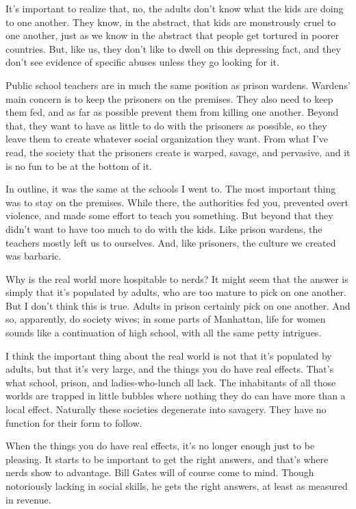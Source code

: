 \documentclass[12pt]{book}
\begin{document}
It's important to realize that, no, the adults don't know what the kids
are doing to one another. They know, in the abstract, that kids are
monstrously cruel to one another, just as we know in the abstract that
people get tortured in poorer countries. But, like us, they don't like
to dwell on this depressing fact, and they don't see evidence of
specific abuses unless they go looking for it.

Public school teachers are in much the same position as prison wardens.
Wardens' main concern is to keep the prisoners on the premises. They
also need to keep them fed, and as far as possible prevent them from
killing one another. Beyond that, they want to have as little to do with
the prisoners as possible, so they leave them to create whatever social
organization they want. From what I've read, the society that the
prisoners create is warped, savage, and pervasive, and it is no fun to
be at the bottom of it.

In outline, it was the same at the schools I went to. The most important
thing was to stay on the premises. While there, the authorities fed you,
prevented overt violence, and made some effort to teach you something.
But beyond that they didn't want to have too much to do with the kids.
Like prison wardens, the teachers mostly left us to ourselves. And, like
prisoners, the culture we created was barbaric.

Why is the real world more hospitable to nerds? It might seem that the
answer is simply that it's populated by adults, who are too mature to
pick on one another. But I don't think this is true. Adults in prison
certainly pick on one another. And so, apparently, do society wives; in
some parts of Manhattan, life for women sounds like a continuation of
high school, with all the same petty intrigues.

I think the important thing about the real world is not that it's
populated by adults, but that it's very large, and the things you do
have real effects. That's what school, prison, and ladies-who-lunch all
lack. The inhabitants of all those worlds are trapped in little bubbles
where nothing they do can have more than a local effect. Naturally these
societies degenerate into savagery. They have no function for their form
to follow.

When the things you do have real effects, it's no longer enough just to
be pleasing. It starts to be important to get the right answers, and
that's where nerds show to advantage. Bill Gates will of course come to
mind. Though notoriously lacking in social skills, he gets the right
answers, at least as measured in revenue.
\end{document}

